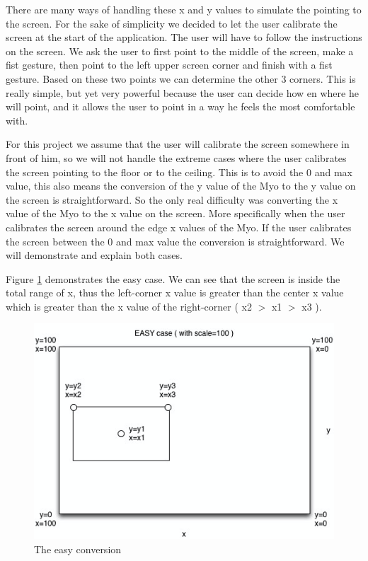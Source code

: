 \documentclass{article}
\begin{document}
There are many ways of handling these x and y values to simulate the pointing to the screen. For the sake of simplicity we decided to let the user calibrate the screen at the start of the application. The user will have to follow the instructions on the screen. We ask the user to first point to the middle of the screen, make a fist gesture, then point to the left upper screen corner and finish with a fist gesture. Based on these two points we can determine the other 3 corners.  This is really simple, but yet very powerful because the user can decide how en where he will point, and it allows the user to point in a way he feels the most comfortable with.

For this project we assume that the user will calibrate the screen somewhere in front of him, so we will not handle the extreme cases where the user calibrates the screen pointing to the floor or to the ceiling. This is to avoid the 0 and max value, this also means the conversion of the y value of the Myo to the y value on the screen is straightforward. So the only real difficulty was converting the x value of the Myo to the x value on the screen. More specifically when the user calibrates the screen around the edge x values of the Myo. If the user calibrates the screen between the 0 and max value the conversion is straightforward. We will demonstrate and explain both cases.

Figure \ref{easyconv} demonstrates the easy case. We can see that the screen is inside the total range of x, thus the left-corner x value is greater than the center x value which is greater than the x value of the right-corner ( x2 $>$ x1 $>$ x3 ).


\begin{figure}[!ht]
  \centering
      \centerline{\includegraphics[width=1\textwidth]{Images/easy-conversion.png}}
  \caption{The easy conversion}
	\label{easyconv}
\end{figure}
\end{document}
